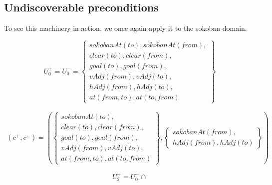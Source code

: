\documentclass[../Master.tex]{subfiles}
\begin{document}
\subsection{Undiscoverable preconditions}

To see this machinery in action, we once again apply it to the sokoban domain.

\[
U_0^+ = U_0^- =
\left\{
    \begin{gathered}
        sokobanAt(to), sokobanAt(from), \\
        clear(to), clear(from), \\
        goal(to), goal(from), \\
        vAdj(from), vAdj(to), \\
        hAdj(from), hAdj(to), \\
        at(from, to), at(to, from)
    \end{gathered}
\right\}
\]

%

\begin{align}
(c^+, c^-) =
\left(
    \left\{
        \begin{gathered}
            sokobanAt(to), \\
            clear(to), clear(from), \\
            goal(to), goal(from), \\
            vAdj(from), vAdj(to), \\
            at(from, to), at(to, from)
        \end{gathered}
    \right\}
    ,
    \left\{
        \begin{gathered}
            sokobanAt(from), \\
            hAdj(from), hAdj(to)
        \end{gathered}
    \right\}
\right)
\end{align}


\[
    U_2^+ = U_0^+ \cap
\]
\end{document}
